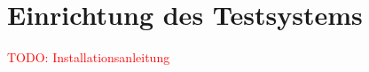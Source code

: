 \section{Einrichtung des Testsystems}\label{appendix1:Einrichtung_des_Testsystems}
\textcolor{red}{TODO: Installationsanleitung}




%












